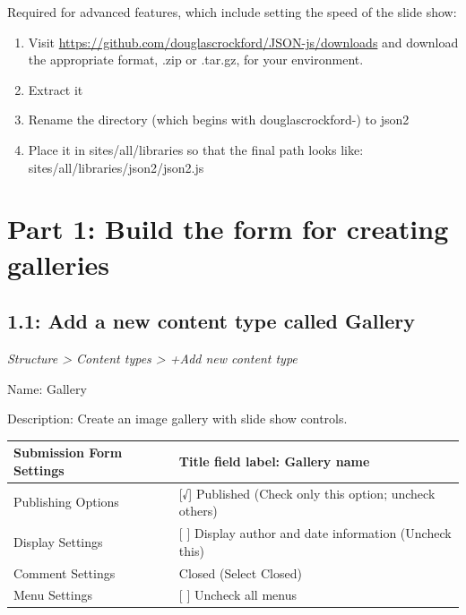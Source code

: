 \documentclass[letterpaper,10pt,english]{sphinxmanual}
\begin{document}
Required for advanced features, which include setting the speed of the slide show:
\begin{enumerate}
\item {} 
Visit \href{https://github.com/douglascrockford/JSON-js/downloads}{https://github.com/douglascrockford/JSON-js/downloads} and download the appropriate format, .zip or .tar.gz, for your environment.

\item {} 
Extract it

\item {} 
Rename the directory (which begins with douglascrockford-) to json2

\item {} 
Place it in sites/all/libraries so that the final path looks like: sites/all/libraries/json2/json2.js

\end{enumerate}


\section{Part 1: Build the form for creating galleries}
\label{slides:part-1-build-the-form-for-creating-galleries}

\subsection{1.1: Add a new content type called Gallery}
\label{slides:add-a-new-content-type-called-gallery}
\emph{Structure \textgreater{} Content types \textgreater{} +Add new content type}

Name: Gallery

Description: Create an image gallery with slide show controls.

\begin{tabulary}{\linewidth}{|L|L|}
\hline

Submission Form Settings
 & 
Title field label: Gallery name
\\\hline

Publishing Options
 & 
{[}√{]} Published (Check only this option; uncheck others)
\\\hline

Display Settings
 & 
{[} {]}  Display author and date information (Uncheck this)
\\\hline

Comment Settings
 & 
Closed (Select Closed)
\\\hline

Menu Settings
 & 
{[} {]}  Uncheck all menus
\\\hline
\end{tabulary}
\end{document}
